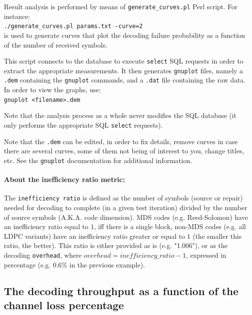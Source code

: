 \documentclass[a4paper,11pt]{article}
\begin{document}
{Result analysis is performed by means of \verb+generate_curves.pl+ Perl script.
For instance:\\
\verb+./generate_curves.pl params.txt -curve=2+\\
is used to generate curves that plot the decoding failure probability as a function
of the number of received symbols.

This script connects to the database to execute \verb+select+ SQL requests in order
to extract the appropriate measurements.
It then generates \verb+gnuplot+ files, namely a \verb+.dem+ containing the
\verb+gnuplot+ commands, and a \verb+.dat+ file containing the raw data.
In order to view the graphs, use:\\
\verb+gnuplot <filename>.dem+

Note that the analysis process as a whole never modifies the SQL database (it only
performs the appropriate SQL \verb+select+ requests).

Note that the \verb+.dem+ can be edited, in order to fix details, remove curves
in case there are several curves, some of them not being of interest to you,
change titles, etc. See the \verb+gnuplot+ documentation for additional information.


\paragraph{About the inefficiency ratio metric:}

The \verb+inefficiency ratio+ is defined as the number of symbols (source or repair) needed for
decoding to complete (in a given test iteration) divided by the number of source symbols
(A.K.A. code dimension).
MDS codes (e.g. Reed-Solomon) have an inefficiency ratio equal to $1$, iff there is a single block,
non-MDS codes (e.g. all LDPC variants) have an inefficiency ratio greater or equal to $1$ (the
smaller this ratio, the better).
This ratio is either provided as is (e.g. "1.006"), or as the decoding \verb+overhead+, where 
$overhead = inefficiency\_ratio - 1$, expressed in percentage (e.g. 0.6\% in the previous example).


\subsection{The decoding throughput as a function of the channel loss percentage}

}
\end{document}
